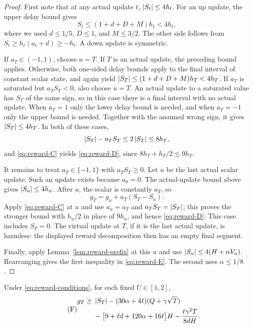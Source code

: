 \begin{proof}
First note that at any actual update $t$,
$\left|S_t\right|\le4h_t$. For an up update, the upper delay bound gives
\[
 S_t\le(1+d+D+M)h_t<4h_t,
\]
where we used $d\le1/5$, $D\le1$, and $M\le3/2$.
The other side follows from
$S_t\ge h_t(a_t+d)\ge-h_t$. A down update is symmetric.

If $a_T\in(-1,1)$, choose $u=T$. If $T$ is an actual update, the
preceding bound applies. Otherwise, both one-sided delay bounds apply
to the final interval of constant scalar state, and again yield
$\left|S_T\right|\le(1+d+D+M)h_T<4h_T$.
If $a_T$ is saturated but $a_T S_T<0$, also choose $u=T$.
An actual update to a saturated value has $S_T$ of the same sign, so
in this case there is a final interval with no actual update. When
$a_T=1$ only the lower delay bound is needed, and when $a_T=-1$ only
the upper bound is needed. Together with the assumed wrong sign, it
gives $\left|S_T\right|\le4h_T$. In both of these cases,
\[
 \left|S_T\right|-a_T S_T\le2\left|S_T\right|\le8h_T,
\]
and \eqref{eq:reward-C} yields \eqref{eq:reward-D}, since
$8h_T+h_T/2\le9h_T$.

It remains to treat $a_T\in\{-1,1\}$ with $a_T S_T\ge0$.
Let $u$ be the last actual scalar update. Such an update exists because
$a_0=0$. The actual-update bound above gives $\left|S_u\right|\le4h_u$.
After $u$, the scalar is constantly $a_T$, so
\[
 g_T=g_u+a_T(S_T-S_u).
\]
Apply \eqref{eq:reward-C} at $u$ and use
$a_u=a_T$ and $a_T S_T=\left|S_T\right|$; this proves the stronger bound with
$h_u/2$ in place of $9h_u$, and hence \eqref{eq:reward-D}.
This case includes $S_T=0$. The virtual update at $T$, if it is the last
actual update, is harmless: the displayed reward decomposition then has
an empty final segment.

Finally, apply Lemma~\ref{lem:reward-prefix} at this $u$ and use
$\left|S_u\right|\le4(H+\alpha V_u)$. Rearranging gives the first inequality
in \eqref{eq:reward-E}. The second uses $\alpha\le1/8$.
\end{proof}

\begin{proposition}\label{prop:reward-generic}
Under \eqref{eq:reward-conditions}, for each fixed $U\in[1,2]$,
\begin{equation}\tag{F}\label{eq:reward-F}
 \begin{split}
 g_T\ge{}&\left|S_T\right|-(30\alpha+4\ell)(Q+\gamma\sqrt T)\\
          &-\bigl[9+\ell d+120\alpha+16\ell\bigr]H
           -\frac{\ell\gamma^2T}{8dH}.
 \end{split}
\end{equation}
\end{proposition}

